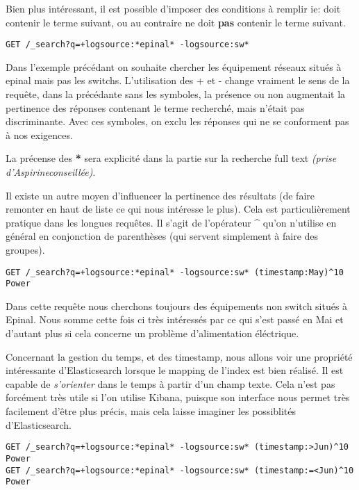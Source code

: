 Bien plus intéressant, il est possible d'imposer des conditions à remplir ie: doit
contenir le terme suivant, ou au contraire ne doit \textbf{pas} contenir le terme 
suivant.

\begin{lstlisting}[style=code,label={lst:APIsearchliteexample3},caption={Conditions must (not) match}]
GET /_search?q=+logsource:*epinal* -logsource:sw*
\end{lstlisting}

Dans l'exemple précédant on souhaite chercher les équipement réseaux situés à epinal
mais pas les switchs.
L'utilisation des + et - change vraiment le sens de la requête, dans la précédante
sans les symboles, la présence ou non augmentait la pertinence des réponses contenant
le terme recherché, mais n'était pas discriminante.
Avec ces symboles, on exclu les réponses qui ne se conforment pas à nos exigences.


La précense des \textbf{*} sera explicité dans la partie sur la recherche full text
{\scriptsize \textit{(prise d'Aspirine\texttrademark conseillée)}}.


Il existe un autre moyen d'influencer la pertinence des résultats (de faire remonter
en haut de liste ce qui nous intéresse le plus).
Cela est particulièrement pratique dans les longues requêtes.
Il s'agit de l'opérateur \textbf{\^} qu'on n'utilise en général en conjonction de
parenthèses (qui servent simplement à faire des groupes).


\begin{lstlisting}[style=code,label={lst:APIsearchliteexample4},caption={Modifier la pertinence}]
GET /_search?q=+logsource:*epinal* -logsource:sw* (timestamp:May)^10 Power
\end{lstlisting}
Dans cette requête nous cherchons toujours des équipements non switch situés à Epinal.
Nous somme cette fois ci très intéressés par ce qui s'est passé en Mai et d'autant
plus si cela concerne un problème d'alimentation éléctrique.

Concernant la gestion du temps, et des timestamp, nous allons voir une propriété 
intéressante d'Elasticsearch lorsque le mapping de l'index est bien réalisé.
Il est capable de \textit{s'orienter} dans le temps à partir d'un champ texte.
Cela n'est pas forcément très utile si l'on utilise Kibana, puisque son interface
nous permet très facilement d'être plus précis, mais cela laisse imaginer les possiblités
d'Elasticsearch.


\begin{lstlisting}[style=code,label={lst:APIsearchliteexample5},caption={Le temps dans SearchLite}]
GET /_search?q=+logsource:*epinal* -logsource:sw* (timestamp:>Jun)^10 Power
GET /_search?q=+logsource:*epinal* -logsource:sw* (timestamp:=<Jun)^10 Power
\end{lstlisting}

